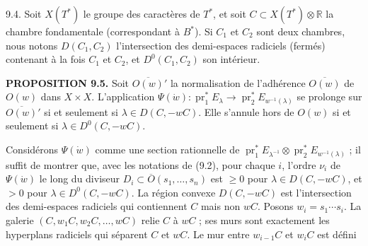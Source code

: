 \documentclass[9pt,twoside]{extarticle}
\begin{document}
{9.4. Soit \(X(T^*)\) le groupe des caractères de \(T^*\), et soit \(C\subset X(T^*)\otimes\mathbb R\) la chambre fondamentale (correspondant à \(B^*\)). Si \(C_1\) et \(C_2\) sont deux chambres, nous notons \(D(C_1,C_2)\) l'intersection des demi-espaces radiciels (fermés) contenant à la fois \(C_1\) et \(C_2\), et \(D^0(C_1,C_2)\) son intérieur.\par

\noindent\textbf{PROPOSITION 9.5.} Soit \(\overline{O(w)}'\) la normalisation de l'adhérence \(\overline{O(w)}\) de \(O(w)\) dans \(X\times X\). L'application \(\Psi(\dot w):\operatorname{pr}_1^*E_\lambda\to\operatorname{pr}_2^*E_{w^{-1}(\lambda)}\) se prolonge sur \(\overline{O(w)}'\) si et seulement si \(\lambda\in D(C,-wC)\). Elle s'annule hors de \(O(w)\) si et seulement si \(\lambda\in D^0(C,-wC)\).\par

Considérons \(\Psi(\dot w)\) comme une section rationnelle de \(\operatorname{pr}_1^*E_{\lambda^{-1}}\otimes\operatorname{pr}_2^*E_{w^{-1}(\lambda)}\) ; il suffit de montrer que, avec les notations de (9.2), pour chaque \(i\), l'ordre \(\nu_i\) de \(\Psi(\dot w)\) le long du diviseur \(D_i\subset\overline O(s_1,\ldots,s_n)\) est \(\ge0\) pour \(\lambda\in D(C,-wC)\), et \(>0\) pour \(\lambda\in D^0(C,-wC)\). La région convexe \(D(C,-wC)\) est l'intersection des demi-espaces radiciels qui contiennent \(C\) mais non \(wC\). Posons \(w_i=s_1\cdots s_i\). La galerie \((C,w_1C,w_2C,\ldots,wC)\) relie \(C\) à \(wC\) ; ses murs sont exactement les hyperplans radiciels qui séparent \(C\) et \(wC\). Le mur entre \(w_{i-1}C\) et \(w_iC\) est défini\par
}
\end{document}
